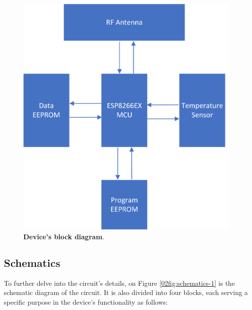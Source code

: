 \begin{figure}[H]
    \centering
    \includegraphics[scale = 0.8]{imagens/BD.png}
    \caption{\textbf{Device's block diagram}.}
    \label{02fig:BD}
\end{figure}


\subsection{Schematics}\label{02Sub:Schematics}

To further delve into the circuit's details, on Figure \ref{02fig:schematics-1} is the schematic diagram of the circuit. It is also divided into 
four blocks, each serving a specific purpose in the device's functionality as follows:

